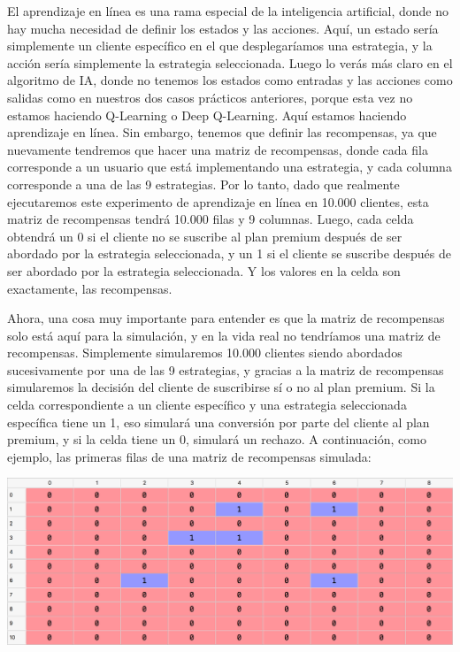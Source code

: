 \documentclass[]{book}
\begin{document}
El aprendizaje en línea es una rama especial de la inteligencia artificial, donde no hay mucha necesidad de definir los estados y las acciones. Aquí, un estado sería simplemente un cliente específico en el que desplegaríamos una estrategia, y la acción sería simplemente la estrategia seleccionada. Luego lo verás más claro en el algoritmo de IA, donde no tenemos los estados como entradas y las acciones como salidas como en nuestros dos casos prácticos anteriores, porque esta vez no estamos haciendo Q-Learning o Deep Q-Learning. Aquí estamos haciendo aprendizaje en línea. Sin embargo, tenemos que definir las recompensas, ya que nuevamente tendremos que hacer una matriz de recompensas, donde cada fila corresponde a un usuario que está implementando una estrategia, y cada columna corresponde a una de las 9 estrategias. Por lo tanto, dado que realmente ejecutaremos este experimento de aprendizaje en línea en 10.000 clientes, esta matriz de recompensas tendrá 10.000 filas y 9 columnas. Luego, cada celda obtendrá un 0 si el cliente no se suscribe al plan premium después de ser abordado por la estrategia seleccionada, y un 1 si el cliente se suscribe después de ser abordado por la estrategia seleccionada. Y los valores en la celda son exactamente, las recompensas.

Ahora, una cosa muy importante para entender es que la matriz de recompensas solo está aquí para la simulación, y en la vida real no tendríamos una matriz de recompensas. Simplemente simularemos 10.000 clientes siendo abordados sucesivamente por una de las 9 estrategias, y gracias a la matriz de recompensas simularemos la decisión del cliente de suscribirse sí o no al plan premium. Si la celda correspondiente a un cliente específico y una estrategia seleccionada específica tiene un 1, eso simulará una conversión por parte del cliente al plan premium, y si la celda tiene un 0, simulará un rechazo. A continuación, como ejemplo, las primeras filas de una matriz de recompensas simulada:

\includegraphics{Images/Rewards_Matrix.png}
\end{document}
